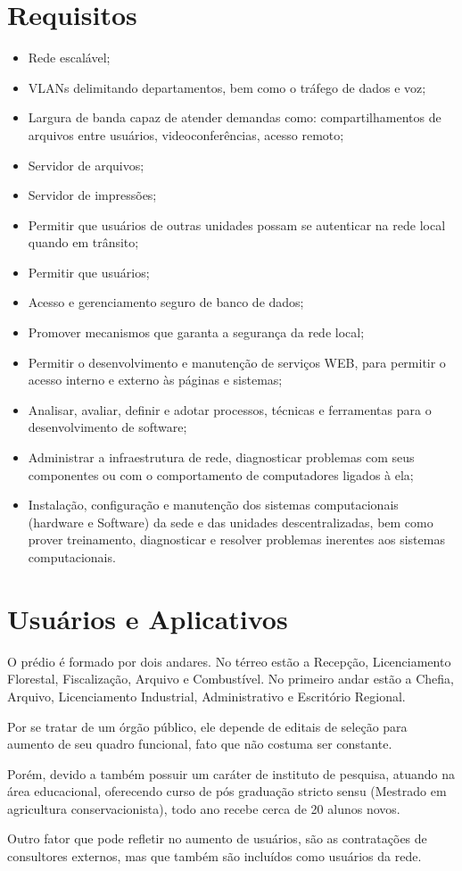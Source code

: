 \documentclass[	DIV=calc,%
							paper=a4,%
							fontsize=12pt,%
							onecolumn]{scrartcl}	 					%
\begin{document}
\section{Requisitos}
\begin{itemize}
\item Rede escalável;
\item VLANs delimitando departamentos, bem como o tráfego de dados e voz;
\item Largura de banda capaz de atender demandas como: compartilhamentos de arquivos entre usuários, videoconferências, acesso remoto;
\item Servidor de arquivos;
\item Servidor de impressões;
\item Permitir que usuários de outras unidades possam se autenticar na rede local quando em trânsito;
\item Permitir que usuários;
\item Acesso e gerenciamento seguro de banco de dados;
\item Promover mecanismos que garanta a segurança da rede local;
\item Permitir o desenvolvimento e manutenção de serviços WEB, para permitir o acesso interno e externo às páginas e sistemas;
\item Analisar, avaliar, definir e adotar processos, técnicas e ferramentas para o desenvolvimento de software;
\item Administrar a infraestrutura de rede, diagnosticar problemas com seus componentes ou com o comportamento de computadores ligados à ela;
\item Instalação, configuração e manutenção dos sistemas computacionais (hardware e Software) da sede e das unidades descentralizadas, bem como prover treinamento, diagnosticar e resolver problemas inerentes aos sistemas computacionais.
\end{itemize}

\section{Usuários e Aplicativos}
O prédio é formado por dois andares. No térreo estão a Recepção, Licenciamento Florestal, Fiscalização, Arquivo e Combustível. No primeiro andar estão a Chefia, Arquivo, Licenciamento Industrial, Administrativo e Escritório Regional.\par
Por se tratar de um órgão público, ele depende de editais de seleção para aumento de seu quadro funcional, fato que não costuma ser constante.\par
Porém, devido a também possuir um caráter de instituto de pesquisa, atuando na área educacional, oferecendo curso de pós graduação stricto sensu (Mestrado em agricultura conservacionista), todo ano recebe cerca de 20 alunos novos.\par
Outro fator que pode refletir no aumento de usuários, são as contratações de consultores externos, mas que também são incluídos como usuários da rede.
\end{document}
